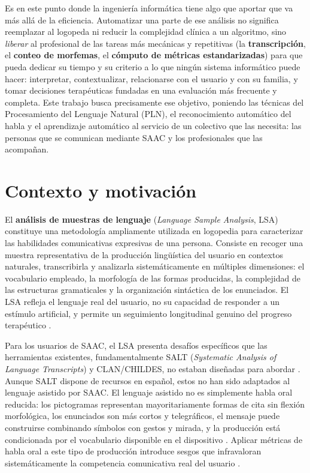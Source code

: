 Es en este punto donde la ingeniería informática tiene algo que aportar que va
más allá de la eficiencia. Automatizar una parte de ese análisis no significa
reemplazar al logopeda ni reducir la complejidad clínica a un algoritmo, sino
\textit{liberar} al profesional de las tareas más mecánicas y repetitivas
(la \textbf{transcripción}, el \textbf{conteo de morfemas}, el
\textbf{cómputo de métricas estandarizadas}) para que pueda dedicar su tiempo
y su criterio a lo que ningún sistema informático puede hacer: interpretar,
contextualizar, relacionarse con el usuario y con su familia, y tomar
decisiones terapéuticas fundadas en una evaluación más frecuente y completa.
Este trabajo busca precisamente ese objetivo, poniendo las técnicas del
Procesamiento del Lenguaje Natural (\ac{PLN}), el reconocimiento automático
del habla y el aprendizaje automático al servicio de un colectivo que las
necesita: las personas que se comunican mediante \ac{SAAC} y los profesionales
que las acompañan.

\section{Contexto y motivación}

El \textbf{análisis de muestras de lenguaje} (\emph{Language Sample Analysis}, LSA)
constituye una metodología ampliamente utilizada en logopedia para caracterizar las
habilidades comunicativas expresivas de una persona. Consiste en recoger una muestra representativa de la 
producción lingüística del usuario en contextos naturales, transcribirla y analizarla 
sistemáticamente en múltiples dimensiones: el vocabulario empleado, la morfología de 
las formas producidas, la complejidad de las estructuras gramaticales y la organización
sintáctica de los enunciados. El \ac{LSA} refleja el lenguaje real del usuario, no su 
capacidad de responder a un estímulo artificial, y permite un seguimiento longitudinal
genuino del progreso terapéutico \cite{lsa_computer_programs}.

Para los usuarios de \ac{SAAC}, el LSA presenta desafíos específicos que las
herramientas existentes, fundamentalmente \ac{SALT} (\emph{Systematic Analysis of
Language Transcripts}) y CLAN/CHILDES, no estaban diseñadas para abordar
\cite{soto2022paalss_tutorial}. Aunque \ac{SALT} dispone de recursos en español,
estos no han sido adaptados al lenguaje asistido por \ac{SAAC}. El lenguaje asistido no es simplemente habla oral 
reducida: los pictogramas representan mayoritariamente formas de cita sin flexión 
morfológica, los enunciados son más cortos y telegráficos, el mensaje puede construirse 
combinando símbolos con gestos y mirada, y la producción está condicionada por el 
vocabulario disponible en el dispositivo \cite{nlp_aac_application}. Aplicar métricas 
de habla oral a este tipo de producción introduce sesgos que infravaloran sistemáticamente la
competencia comunicativa real del usuario \cite{soto2022paalss_tutorial}.

